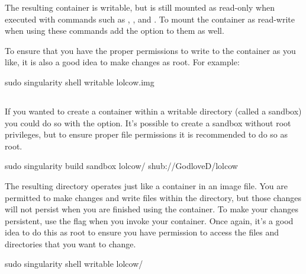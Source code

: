 \documentclass[letterpaper,10pt,english]{sphinxmanual}
\begin{document}
The resulting container is writable, but is still mounted as read-only
when executed with commands such as , , and . To mount the container
as read-write when using these commands add the  option to them as
well.

To ensure that you have the proper permissions to write to the
container as you like, it is also a good idea to make changes as root.
For example:

%
\begin{sphinxVerbatim}[commandchars=\\\{\}]
\PYGZdl{} sudo singularity shell \PYGZhy{}\PYGZhy{}writable lolcow.img
\end{sphinxVerbatim}


\subsection{}
\label{\detokenize{build_a_container:sandbox}}
If you wanted to create a container within a writable directory (called
a sandbox) you could do so with the  option. It’s possible to create a
sandbox without root privileges, but to ensure proper file permissions
it is recommended to do so as root.

%
\begin{sphinxVerbatim}[commandchars=\\\{\}]
\PYGZdl{} sudo singularity build \PYGZhy{}\PYGZhy{}sandbox lolcow/ shub://GodloveD/lolcow
\end{sphinxVerbatim}

The resulting directory operates just like a container in an image
file. You are permitted to make changes and write files within the
directory, but those changes will not persist when you are finished
using the container. To make your changes persistent, use the  flag
when you invoke your container.
Once again, it’s a good idea to do this as root to ensure you have
permission to access the files and directories that you want to
change.

%
\begin{sphinxVerbatim}[commandchars=\\\{\}]
\PYGZdl{} sudo singularity shell \PYGZhy{}\PYGZhy{}writable lolcow/
\end{sphinxVerbatim}
\end{document}
